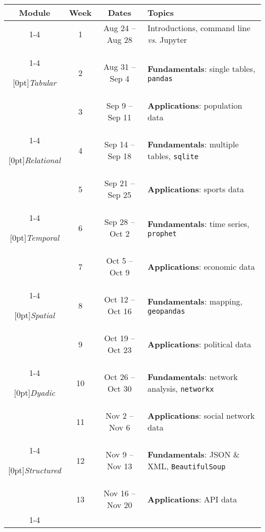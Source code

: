 \documentclass[10pt]{memoir}
\begin{document}
\vspace{2em}

\begin{table}[h]
\centering
\begin{tabular}{cccl}
    \toprule[.15em]
    \textbf{Module} & \textbf{Week} & \textbf{Dates} & \textbf{Topics} \\
    \cmidrule[.1em](lr){1-4}
    
    & 1 & Aug 24 -- Aug 28 & Introductions, command line \textit{vs}. Jupyter \\
    \cmidrule[.1em](lr){1-4}
        
    \multirow{2}{*}[0pt]{\textit{Tabular}} %
        & 2 & Aug 31 -- Sep 4 & \textbf{Fundamentals}: single tables, \texttt{pandas} \\ 
        & 3 & Sep 9 -- Sep 11 & \textbf{Applications}: population data \\ \cmidrule[.1em](lr){1-4}
    
    \multirow{2}{*}[0pt]{\textit{Relational}} %
        & 4 & Sep 14 -- Sep 18 & \textbf{Fundamentals}: multiple tables, \texttt{sqlite} \\ 
        & 5 & Sep 21 -- Sep 25 & \textbf{Applications}: sports data \\ 
        \cmidrule[.1em](lr){1-4}
        
    \multirow{2}{*}[0pt]{\textit{Temporal}} %
        & 6 & Sep 28 -- Oct 2 & \textbf{Fundamentals}: time series, \texttt{prophet} \\
        & 7 & Oct 5 -- Oct 9 & \textbf{Applications}: economic data  \\ 
        \cmidrule[.1em](lr){1-4}
        
    \multirow{2}{*}[0pt]{\textit{Spatial}} %
        & 8 & Oct 12 -- Oct 16 & \textbf{Fundamentals}: mapping, \texttt{geopandas} \\
        & 9 & Oct 19 -- Oct 23 & \textbf{Applications}: political data \\ \cmidrule[.1em](lr){1-4}
    
    \multirow{2}{*}[0pt]{\textit{Dyadic}} %
        & 10 & Oct 26 -- Oct 30 & \textbf{Fundamentals}: network analysis, \texttt{networkx} \\
        & 11 & Nov 2 -- Nov 6 & \textbf{Applications}: social network data \\ \cmidrule[.1em](lr){1-4}
        
    \multirow{2}{*}[0pt]{\textit{Structured}} %
        & 12 & Nov 9 -- Nov 13 & \textbf{Fundamentals}: JSON \& XML, \texttt{BeautifulSoup} \\
        & 13 & Nov 16 -- Nov 20 & \textbf{Applications}: API data \\ 
        \cmidrule[.1em](lr){1-4}
    

\end{tabular}
\end{table}
\end{document}
